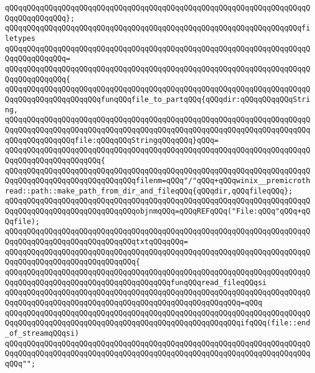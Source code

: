 \verb|qQQqqQQqqQQqqQQqqQQqqQQqqQQqqQQqqQQqqQQqqQQqqQQqqQQqqQQqqQQqqQQqqQQqqQQqqQQqqQQqqQQq};|\newline
\newline
\verb|qQQqqQQqqQQqqQQqqQQqqQQqqQQqqQQqqQQqqQQqqQQqqQQqqQQqqQQqqQQqqQQqqQQqfiletypes|\newline
\verb|qQQqqQQqqQQqqQQqqQQqqQQqqQQqqQQqqQQqqQQqqQQqqQQqqQQqqQQqqQQqqQQqqQQqqQQqqQQqqQQqqQQq=|\newline
\verb|qQQqqQQqqQQqqQQqqQQqqQQqqQQqqQQqqQQqqQQqqQQqqQQqqQQqqQQqqQQqqQQqqQQqqQQqqQQqqQQqqQQq{|\newline
\verb|qQQqqQQqqQQqqQQqqQQqqQQqqQQqqQQqqQQqqQQqqQQqqQQqqQQqqQQqqQQqqQQqqQQqqQQqqQQqqQQqqQQqqQQqqQQqfunqQQqfile_to_partqQQq{qQQqdir:qQQqqQQqqQQqString,|\newline
\verb|qQQqqQQqqQQqqQQqqQQqqQQqqQQqqQQqqQQqqQQqqQQqqQQqqQQqqQQqqQQqqQQqqQQqqQQqqQQqqQQqqQQqqQQqqQQqqQQqqQQqqQQqqQQqqQQqqQQqqQQqqQQqqQQqqQQqqQQqqQQqqQQqqQQqqQQqqQQqfile:qQQqqQQqStringqQQqqQQq}qQQq=|\newline
\verb|qQQqqQQqqQQqqQQqqQQqqQQqqQQqqQQqqQQqqQQqqQQqqQQqqQQqqQQqqQQqqQQqqQQqqQQqqQQqqQQqqQQqqQQqqQQq{|\newline
\verb|qQQqqQQqqQQqqQQqqQQqqQQqqQQqqQQqqQQqqQQqqQQqqQQqqQQqqQQqqQQqqQQqqQQqqQQqqQQqqQQqqQQqqQQqqQQqqQQqqQQqfilenm=qQQq"/"qQQq+qQQqwinix__premicrothread::path::make_path_from_dir_and_fileqQQq{qQQqdir,qQQqfileqQQq};|\newline
\verb|qQQqqQQqqQQqqQQqqQQqqQQqqQQqqQQqqQQqqQQqqQQqqQQqqQQqqQQqqQQqqQQqqQQqqQQqqQQqqQQqqQQqqQQqqQQqqQQqqQQqobjnmqQQq=qQQqREFqQQq("File:qQQq"qQQq+qQQqfile);|\newline
\verb|qQQqqQQqqQQqqQQqqQQqqQQqqQQqqQQqqQQqqQQqqQQqqQQqqQQqqQQqqQQqqQQqqQQqqQQqqQQqqQQqqQQqqQQqqQQqqQQqqQQqtxtqQQqqQQq=|\newline
\verb|qQQqqQQqqQQqqQQqqQQqqQQqqQQqqQQqqQQqqQQqqQQqqQQqqQQqqQQqqQQqqQQqqQQqqQQqqQQqqQQqqQQqqQQqqQQqqQQqqQQq{|\newline
\verb|qQQqqQQqqQQqqQQqqQQqqQQqqQQqqQQqqQQqqQQqqQQqqQQqqQQqqQQqqQQqqQQqqQQqqQQqqQQqqQQqqQQqqQQqqQQqqQQqqQQqqQQqqQQqfunqQQqread_fileqQQqsi|\newline
\verb|qQQqqQQqqQQqqQQqqQQqqQQqqQQqqQQqqQQqqQQqqQQqqQQqqQQqqQQqqQQqqQQqqQQqqQQqqQQqqQQqqQQqqQQqqQQqqQQqqQQqqQQqqQQqqQQqqQQqqQQqqQQq=qQQq|\newline
\verb|qQQqqQQqqQQqqQQqqQQqqQQqqQQqqQQqqQQqqQQqqQQqqQQqqQQqqQQqqQQqqQQqqQQqqQQqqQQqqQQqqQQqqQQqqQQqqQQqqQQqqQQqqQQqqQQqqQQqqQQqqQQqifqQQq(file::end_of_streamqQQqsi)|\newline
\verb|qQQqqQQqqQQqqQQqqQQqqQQqqQQqqQQqqQQqqQQqqQQqqQQqqQQqqQQqqQQqqQQqqQQqqQQqqQQqqQQqqQQqqQQqqQQqqQQqqQQqqQQqqQQqqQQqqQQqqQQqqQQqqQQqqQQqqQQqqQQqqQQq"";|\newline
